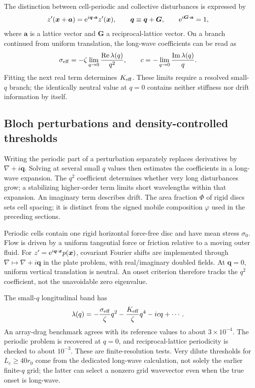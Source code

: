 The distinction between cell-periodic and collective disturbances is expressed by
\begin{equation}
z'(\bm x+\bm a)=\mathrm{e}^{i\bm q\cdot\bm a}z'(\bm x),\qquad
\bm q\equiv\bm q+\bm G,
\qquad \mathrm{e}^{i\bm G\cdot\bm a}=1,
\label{eq:bloch-phase}
\end{equation}
where $\bm a$ is a lattice vector and $\bm G$ a reciprocal-lattice vector. On a branch continued from uniform translation, the long-wave coefficients can be read as
\begin{equation}
\sigma_{\rm eff}=-\zeta\lim_{q\to0}\frac{\operatorname{Re}\lambda(q)}{q^2},
\qquad c=-\lim_{q\to0}\frac{\operatorname{Im}\lambda(q)}{q}.
\label{eq:bloch-coefficients}
\end{equation}
Fitting the next real term determines $K_{\rm eff}$. These limits require a resolved small-$q$ branch; the identically neutral value at $q=0$ contains neither stiffness nor drift information by itself.

\subsection{Bloch perturbations and density-controlled thresholds}


Writing the periodic part of a perturbation separately replaces derivatives by $\nabla+i\bm q$. Solving at several small $q$ values then estimates the coefficients in a long-wave expansion. The $q^2$ coefficient determines whether very long disturbances grow; a stabilizing higher-order term limits short wavelengths within that expansion. An imaginary term describes drift. The area fraction $\Phi$ of rigid discs sets cell spacing; it is distinct from the signed mobile composition $\varphi$ used in the preceding sections.


Periodic cells contain one rigid horizontal force-free disc and have mean stress $\sigma_0$. Flow is driven by a uniform tangential force or friction relative to a moving outer fluid. For $z'=\mathrm{e}^{i\bm q\cdot\bm x}p(\bm x)$, covariant Fourier shifts are implemented through $\nabla\mapsto\nabla+i\bm q$ in the plate problem, with real/imaginary doubled fields. At $\bm q=0$, uniform vertical translation is neutral. An onset criterion therefore tracks the $q^2$ coefficient, not the unavoidable zero eigenvalue.

The small-$q$ longitudinal band has
\begin{equation}
\lambda(q)=-\frac{\sigma_{\rm eff}}{\zeta}q^2-\frac{K_{\rm eff}}{\zeta}q^4-icq+\cdots.
\end{equation}
An array-drag benchmark agrees with its reference values to about $3\times10^{-4}$. The periodic problem is recovered at $q=0$, and reciprocal-lattice periodicity is checked to about $10^{-3}$. These are finite-resolution tests. Very dilute thresholds for $L_c\geq40r_0$ come from the dedicated long-wave calculation, not solely the earlier finite-$q$ grid; the latter can select a nonzero grid wavevector even when the true onset is long-wave.

